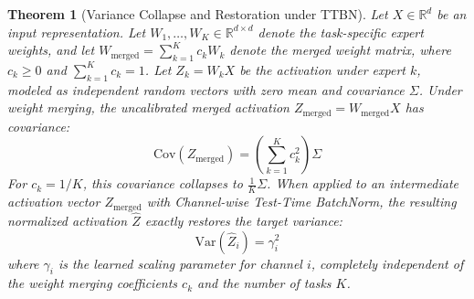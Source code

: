 \documentclass{article}
\theoremstyle{plain}
\newtheorem{theorem}{Theorem}[section]
\theoremstyle{definition}
\theoremstyle{remark}
\begin{document}
\begin{theorem}[Variance Collapse and Restoration under TTBN]
\label{thm:variance}
Let $X \in \mathbb{R}^d$ be an input representation. Let $W_1, \dots, W_K \in \mathbb{R}^{d \times d}$ denote the task-specific expert weights, and let $W_{\text{merged}} = \sum_{k=1}^K c_k W_k$ denote the merged weight matrix, where $c_k \ge 0$ and $\sum_{k=1}^K c_k = 1$. Let $Z_k = W_k X$ be the activation under expert $k$, modeled as independent random vectors with zero mean and covariance $\Sigma$. Under weight merging, the uncalibrated merged activation $Z_{\text{merged}} = W_{\text{merged}} X$ has covariance:
\begin{equation}
    \text{Cov}(Z_{\text{merged}}) = \left( \sum_{k=1}^K c_k^2 \right) \Sigma
\end{equation}
For $c_k = 1/K$, this covariance collapses to $\frac{1}{K} \Sigma$. When applied to an intermediate activation vector $Z_{\text{merged}}$ with Channel-wise Test-Time BatchNorm, the resulting normalized activation $\hat{Z}$ exactly restores the target variance:
\begin{equation}
    \text{Var}(\hat{Z}_i) = \gamma_i^2
\end{equation}
where $\gamma_i$ is the learned scaling parameter for channel $i$, completely independent of the weight merging coefficients $c_k$ and the number of tasks $K$.
\end{theorem}
\end{document}
